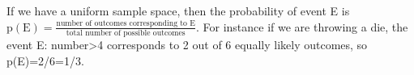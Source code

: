 If we have a uniform sample space, then the probability of
event E is $ \mathrm{p(E)} = 
\frac{\text{number of outcomes corresponding to E}}{\text{total number of possible outcomes}}. $ For instance if we are throwing a die, the event E: number>4 corresponds
to 2 out of 6 equally likely outcomes, so p(E)=2/6=1/3.